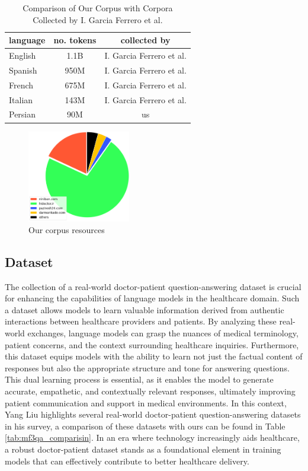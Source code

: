 \documentclass[conference]{IEEEtran}
\begin{document}
	\begin{table}[ht]
		\centering
		\caption{Comparison of Our Corpus with Corpora Collected by I. Garcia Ferrero et al.}
		\begin{tabular}{|l|c|c|}  %
			\hline
			language& no. tokens & collected by \\ \hline
			English & 1.1B & I. Garcia Ferrero et al. \\ \hline
			Spanish & 950M & I. Garcia Ferrero et al.  \\ \hline
			French & 675M & I. Garcia Ferrero et al.  \\ \hline
			Italian& 143M &  I. Garcia Ferrero et al.  \\ \hline
			Persian& 90M & us	\\ \hline
		\end{tabular}
		\label{tab:corpus_comparison}
	\end{table}
	
	\begin{figure}[htbp]
		\centerline{\includegraphics[width=0.4\textwidth]{fig1.png}}
		\caption{Our corpus resources}
		\label{fig1}
	\end{figure}
	
	\subsection{Dataset}
	The collection of a real-world doctor-patient question-answering dataset is crucial for enhancing the capabilities of language models in the healthcare domain. Such a dataset allows models to learn valuable information derived from authentic interactions between healthcare providers and patients. By analyzing these real-world exchanges, language models can grasp the nuances of medical terminology, patient concerns, and the context surrounding healthcare inquiries. Furthermore, this dataset equips models with the ability to learn not just the factual content of responses but also the appropriate structure and tone for answering questions. This dual learning process is essential, as it enables the model to generate accurate, empathetic, and contextually relevant responses, ultimately improving patient communication and support in medical environments. In this context, Yang Liu 
	\cite{b20}
	highlights several real-world doctor-patient question-answering datasets in his survey, a comparison of these datasets with ours can be found in Table 
	\ref{tab:mf3qa_comparisin}. In an era where technology increasingly aids healthcare, a robust doctor-patient dataset stands as a foundational element in training models that can effectively contribute to better healthcare delivery.
	
\end{document}
